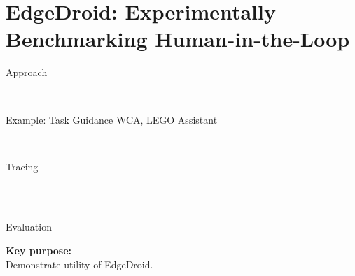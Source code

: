 \documentclass[aspectratio=1610]{beamer}
\begin{document}
\section{EdgeDroid: Experimentally Benchmarking Human-in-the-Loop}

\begin{frame}{Approach}
    \begin{center}
        \\%
        \vspace{.1\textheight}%
    \end{center}
\end{frame}

\begin{frame}{Example: Task Guidance WCA, LEGO Assistant\ \autocite{Ha:TowardsWearableCogAssist}}
    \begin{center}
        \\
    \end{center}
\end{frame}

\begin{frame}{Tracing}
    \begin{center}
        \\
        \vspace{.1\textheight}%
        \\
    \end{center}
\end{frame}

\begin{frame}{Evaluation}
    \begin{center}
        \Large%
        \textbf{Key purpose:}\\
        Demonstrate utility of EdgeDroid.\\
    \end{center}
\end{frame}
\end{document}
